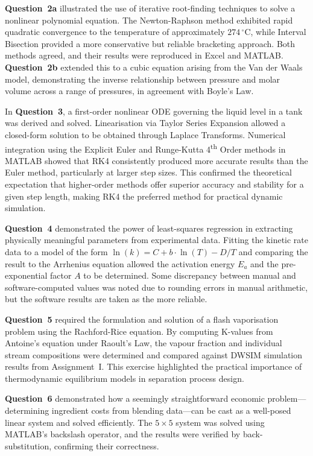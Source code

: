 \documentclass[12pt,a4paper]{article}
\begin{document}
\textbf{Question~2a} illustrated the use of iterative root-finding techniques to solve a nonlinear
polynomial equation. The Newton-Raphson method exhibited rapid quadratic convergence to
the temperature of approximately $274\,^{\circ}$C, while Interval Bisection provided a more
conservative but reliable bracketing approach. Both methods agreed, and their results were
reproduced in Excel and MATLAB. \textbf{Question~2b} extended this to a cubic equation arising
from the Van der Waals model, demonstrating the inverse relationship between pressure and
molar volume across a range of pressures, in agreement with Boyle's Law.

In \textbf{Question~3}, a first-order nonlinear ODE governing the liquid level in a tank was
derived and solved. Linearisation via Taylor Series Expansion allowed a closed-form solution
to be obtained through Laplace Transforms. Numerical integration using the Explicit Euler
and Runge-Kutta 4\textsuperscript{th} Order methods in MATLAB showed that RK4 consistently produced
more accurate results than the Euler method, particularly at larger step sizes. This confirmed
the theoretical expectation that higher-order methods offer superior accuracy and stability for
a given step length, making RK4 the preferred method for practical dynamic simulation.

\textbf{Question~4} demonstrated the power of least-squares regression in extracting physically
meaningful parameters from experimental data. Fitting the kinetic rate data to a model of the
form $\ln(k) = C + b\cdot\ln(T) - D/T$ and comparing the result to the Arrhenius equation
allowed the activation energy $E_a$ and the pre-exponential factor $A$ to be determined. Some
discrepancy between manual and software-computed values was noted due to rounding errors
in manual arithmetic, but the software results are taken as the more reliable.

\textbf{Question~5} required the formulation and solution of a flash vaporisation problem using
the Rachford-Rice equation. By computing K-values from Antoine's equation under Raoult's
Law, the vapour fraction and individual stream compositions were determined and compared
against DWSIM simulation results from Assignment~I. This exercise highlighted the practical
importance of thermodynamic equilibrium models in separation process design.

\textbf{Question~6} demonstrated how a seemingly straightforward economic problem---determining
ingredient costs from blending data---can be cast as a well-posed linear system and solved
efficiently. The $5\times5$ system was solved using MATLAB's backslash operator, and the
results were verified by back-substitution, confirming their correctness.
\end{document}
